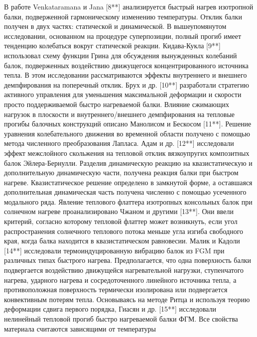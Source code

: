 В работе Venkataramana и Jana [8**] анализируется быстрый нагрев изотропной балки, подверженной гармоническому изменению температуры. Отклик балки получен в двух частях: статической и динамической. В вышеупомянутом исследовании, основанном на процедуре суперпозиции, полный прогиб имеет тенденцию колебаться вокруг статической реакции. Кидава-Кукла [9**] использовал схему функции Грина для обсуждения вынужденных колебаний балок, подверженных воздействию движущегося концентрированного источника тепла. В этом исследовании рассматриваются эффекты внутреннего и внешнего демпфирования на поперечный отклик. Брух и др. [10**] разработали стратегию активного управления для уменьшения максимальной деформации и скорости просто поддерживаемой быстро нагреваемой балки.  Влияние сжимающих нагрузок в плоскости и внутреннего/внешнего демпфирования на тепловые прогибы балочных конструкций описано Манолисом и Бескосом [11**]. Решение уравнения колебательного движения во временной области получено с помощью метода численного преобразования Лапласа. Адам и др. [12**] исследовали эффект межслойного скольжения на тепловой отклик вязкоупругих композитных балок Эйлера-Бернулли. Разделив динамическую реакцию на квазистатическую и дополнительную динамическую части, получена реакция балки при быстром нагреве. Квазистатическое решение определено в замкнутой форме, а оставшаяся дополнительная динамическая часть получена численно с помощью усеченного модального ряда. Явление теплового флаттера изотропных консольных балок при солнечном нагреве проанализировано Чжаном и другими [13**]. Они ввели критерий, согласно которому тепловой флаттер может возникнуть, если угол распространения солнечного теплового потока меньше угла изгиба свободного края, когда балка находится в квазистатическом равновесии. Малик и Кадоли [14**] исследовали термоиндуцированную вибрацию балок из FGM при различных типах быстрого нагрева. Предполагается, что одна поверхность балки подвергается воздействию движущейся нагревательной нагрузки, ступенчатого нагрева, ударного нагрева и сосредоточенного линейного источника тепла, а противоположная поверхность термически изолирована или подвергается конвективным потерям тепла. Основываясь на методе Ритца и используя теорию деформации сдвига первого порядка, Гиасян и др. [15**] исследовали нелинейный тепловой прогиб быстро нагреваемой балки ФГМ. Все свойства материала считаются зависящими от температуры


